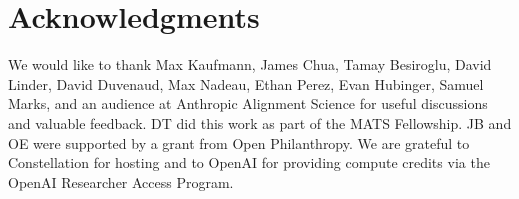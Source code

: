 \section*{Acknowledgments}
We would like to thank Max Kaufmann, James Chua, Tamay Besiroglu, David Linder, David Duvenaud, Max Nadeau, Ethan Perez, Evan Hubinger, Samuel Marks, and an audience at Anthropic Alignment Science for useful discussions and valuable feedback. DT did this work as part of the MATS Fellowship. JB and OE were supported by a grant from Open Philanthropy. We are grateful to Constellation for hosting and to OpenAI for providing compute credits via the OpenAI Researcher Access Program.